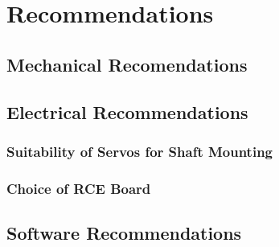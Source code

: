 \chapter{Recommendations}
  
  \section{Mechanical Recomendations}
  \section{Electrical Recommendations}
    \subsection{Suitability of Servos for Shaft Mounting}
    \label{subsec:rec-servoSuitability}
    \subsection{Choice of RCE Board}
    \label{subsec:rec-choiceOfRCEBoard}
  \section{Software Recommendations}
